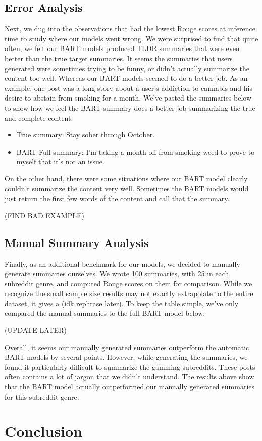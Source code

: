 \documentclass[11pt,a4paper, twocolumn]{article}
\begin{document}
\subsection{Error Analysis}

Next, we dug into the observations that had the lowest Rouge scores at inference time to study where our models went wrong. 
We were surprised to find that quite often, we felt our BART models produced TLDR summaries that were even better than the true target summaries. 
It seems the summaries that users generated were sometimes trying to be funny, or didn't actually summarize the content too well. 
Whereas our BART models seemed to do a better job. As an example, one post was a long story about a user's addiction to cannabis and his desire to 
abstain from smoking for a month. 
We've pasted the summaries below to show how we feel the BART summary does a better job summarizing the true and complete content.

\begin{itemize}
  \item True summary: Stay sober through October.
  \item BART Full summary: I'm taking a month off from smoking weed to prove to myself that it's not an issue.
\end{itemize}


On the other hand, there were some situations where our BART model clearly couldn't summarize the content very well. 
Sometimes the BART models would just return the first few words of the content and call that the summary. 

(FIND BAD EXAMPLE)

\subsection{Manual Summary Analysis}

Finally, as an additional benchmark for our models, we decided to manually generate summaries ourselves. 
We wrote 100 summaries, with 25 in each subreddit genre, and computed Rouge scores on them for comparison. 
While we recognize the small sample size results may not exactly extrapolate to the entire dataset, 
it gives a (idk rephrase later).
To keep the table simple, we've only compared the manual summaries to the full BART model below:

(UPDATE LATER)

Overall, it seems our manually generated summaries outperform the automatic BART models by several points. 
However, while generating the summaries, we found it particularly difficult to summarize the gamming subreddits. 
These posts often contains a lot of jargon that we didn't understand. 
The results above show that the BART model actually outperformed our manually generated summaries for this subreddit genre. 



\section{Conclusion}
\end{document}
